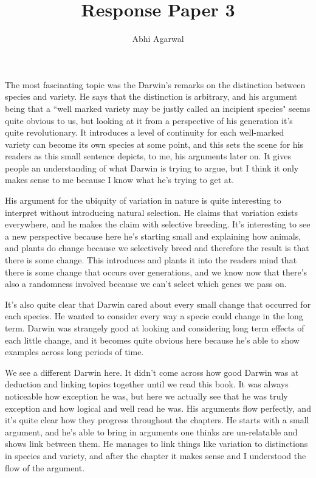 \documentclass[11pt, oneside]{article}
\title{Response Paper 3}
\author{Abhi Agarwal}
\date{}
\begin{document}
\maketitle

\par The most fascinating topic was the Darwin's remarks on the distinction between species and variety. He says that the distinction is arbitrary, and his argument being that a ``well marked variety may be justly called an incipient species" seems quite obvious to us, but looking at it from a perspective of his generation it's quite revolutionary. It introduces a level of continuity for each well-marked variety can become its own species at some point, and this sets the scene for his readers as this small sentence depicts, to me, his arguments later on. It gives people an understanding of what Darwin is trying to argue, but I think it only makes sense to me because I know what he's trying to get at.

\par His argument for the ubiquity of variation in nature is quite interesting to interpret without introducing natural selection. He claims that variation exists everywhere, and he makes the claim with selective breeding. It's interesting to see a new perspective because here he's starting small and explaining how animals, and plants do change because we selectively breed and therefore the result is that there is some change. This introduces and plants it into the readers mind that there is some change that occurs over generations, and we know now that there's also a randomness involved because we can't select which genes we pass on.

\par It's also quite clear that Darwin cared about every small change that occurred for each species. He wanted to consider every way a specie could change in the long term. Darwin was strangely good at looking and considering long term effects of each little change, and it becomes quite obvious here because he's able to show examples across long periods of time.

\par We see a different Darwin here. It didn't come across how good Darwin was at deduction and linking topics together until we read this book. It was always noticeable how exception he was, but here we actually see that he was truly exception and how logical and well read he was. His arguments flow perfectly, and it's quite clear how they progress throughout the chapters. He starts with a small argument, and he's able to bring in arguments one thinks are un-relatable and shows link between them. He manages to link things like variation to distinctions in species and variety, and after the chapter it makes sense and I understood the flow of the argument.
\end{document}
